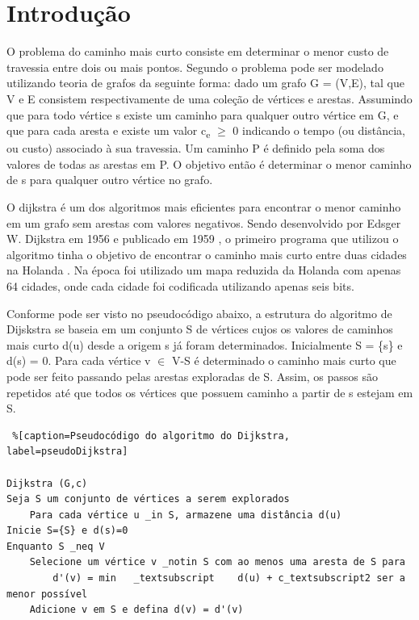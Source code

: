 \documentclass[
	12pt,				%
	oneside,			%
	a4paper,			%
	english,			%
	french,				%
	spanish,			%
	brazil,				%
	]{abntex2}
\begin{document}
\chapter*[Introdução]{Introdução}
O problema do caminho mais curto consiste em determinar o menor custo de travessia entre dois ou mais pontos. Segundo  o problema pode ser modelado utilizando teoria de grafos da seguinte forma: dado um grafo \textsf{G = (V,E)}, tal que \textsf{V} e \textsf{E} consistem respectivamente de uma coleção de vértices e arestas. Assumindo que para todo vértice \textsf{s} existe um caminho para qualquer outro vértice em \textsf{G}, e que para cada aresta \textsf{e} existe um valor \textsf{c\textsubscript{e} $\ge$ 0} indicando o tempo (ou distância, ou custo) associado à sua travessia. Um caminho \textsf{P} é definido pela soma dos valores de todas as arestas em \textsf{P}. O objetivo então é determinar o menor caminho de \textsf{s} para qualquer outro vértice no grafo.

O dijkstra é um dos algoritmos mais eficientes para encontrar o menor caminho em um grafo sem arestas com valores negativos. Sendo desenvolvido por Edsger W. Dijkstra em 1956 \cite{Misa:2010:IEW:1787234.1787249} e publicado em 1959 \cite{Dijkstra:1959:NTP:2722880.2722945}, o primeiro programa que utilizou o algoritmo tinha o objetivo de encontrar o caminho mais curto entre duas cidades na Holanda \cite{Misa:2010:IEW:1787234.1787249}. Na época foi utilizado um mapa reduzida da Holanda com apenas 64 cidades, onde cada cidade foi codificada utilizando apenas seis bits.
    
Conforme pode ser visto no pseudocódigo abaixo, a estrutura do algoritmo de Dijskstra se baseia em um conjunto \textsf{S} de vértices cujos os valores de caminhos mais curto \textsf{d(u)} desde a origem \textsf{s} já foram determinados. Inicialmente \textsf{S = \{s\}} e \textsf{d(s) = 0}. Para cada vértice \textsf{v $\in$ V-S} é determinado o caminho mais curto que pode ser feito passando pelas arestas exploradas de \textsf{S}. Assim, os passos são repetidos até que todos os vértices que possuem caminho a partir de \textsf{s} estejam em \textsf{S}.

\begin{lstlisting} %[caption=Pseudocódigo do algoritmo do Dijkstra, label=pseudoDijkstra]

Dijkstra (G,c)
Seja S um conjunto de vértices a serem explorados
    Para cada vértice u _in S, armazene uma distância d(u)    
Inicie S={S} e d(s)=0
Enquanto S _neq V
    Selecione um vértice v _notin S com ao menos uma aresta de S para
        d'(v) = min   _textsubscript    d(u) + c_textsubscript2 ser a menor possível        
    Adicione v em S e defina d(v) = d'(v)    
\end{lstlisting}
\end{document}
